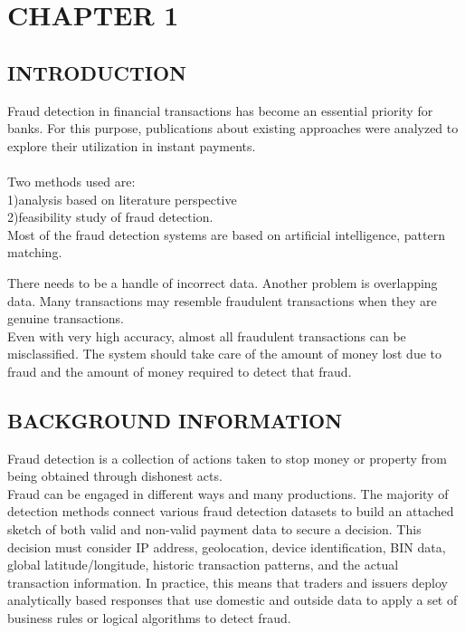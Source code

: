 \documentclass[12pt]{article}
\begin{document}
\section{CHAPTER 1}
\subsection{INTRODUCTION}
Fraud detection in financial transactions has become an essential priority for banks. For this purpose, publications about existing approaches were analyzed to explore their utilization in instant payments.\\
\\
Two methods used are:\\
 1)analysis based on literature perspective\\
 2)feasibility study of fraud detection.  \\
  Most of the fraud detection systems are based on artificial intelligence, pattern matching.  
  
There needs to be a handle of incorrect data. Another problem is overlapping data. Many transactions may resemble fraudulent transactions when they are genuine transactions.\\
Even with very high accuracy, almost all fraudulent transactions can be misclassified.  The system should take care of the amount of money lost due to fraud and the amount of money required to detect that fraud.

\subsection{BACKGROUND INFORMATION}
Fraud detection is a collection of actions taken to stop money or property from being obtained through dishonest acts.\\
Fraud can be engaged in different ways and many productions. The majority of detection methods connect various fraud detection datasets to build an attached sketch of both valid and non-valid payment data to secure a decision. This decision must consider IP address, geolocation, device identification, BIN data, global latitude/longitude, historic transaction patterns, and the actual transaction information. In practice, this means that traders and issuers deploy analytically based responses that use domestic and outside data to apply a set of business rules or logical algorithms to detect fraud.
\pagebreak
\end{document}
